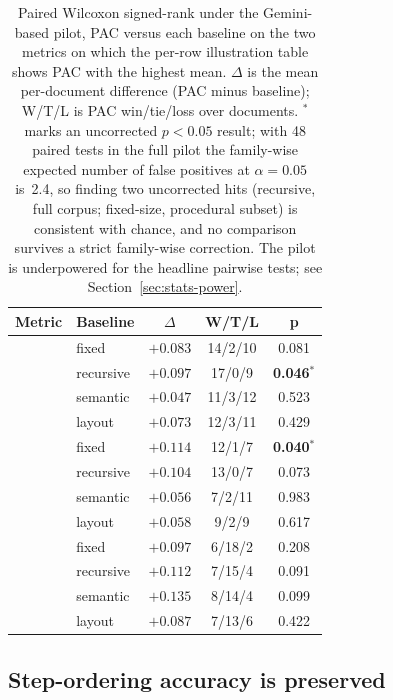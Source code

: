 \documentclass[make,article,submit,oneauthor,pdftex]{Definitions/mdpi}
\begin{document}
\begin{table}[ht]
\centering
\caption{Paired Wilcoxon signed-rank under the Gemini-based pilot,
PAC versus each baseline on the two metrics on which the per-row
illustration table shows PAC with the highest mean. $\Delta$ is the
mean per-document difference (PAC minus baseline); W/T/L is PAC
win/tie/loss over documents. $^{*}$ marks an uncorrected $p<0.05$
result; with 48 paired tests in the full pilot the family-wise
expected number of false positives at $\alpha=0.05$ is~2.4, so
finding two uncorrected hits (recursive, full corpus; fixed-size,
procedural subset) is consistent with chance, and no comparison
survives a strict family-wise correction. The pilot is underpowered
for the headline pairwise tests; see Section~\ref{sec:stats-power}.}
\label{tab:wilcoxon}
\begin{tabular}{llccc}
\toprule
Metric & Baseline & $\Delta$ & W/T/L & p \\
\midrule
{}
 & fixed     & $+0.083$ & 14/2/10 & 0.081 \\
 & recursive & $+0.097$ & 17/0/9  & \textbf{0.046}$^{*}$ \\
 & semantic  & $+0.047$ & 11/3/12 & 0.523 \\
 & layout    & $+0.073$ & 12/3/11 & 0.429 \\
\midrule
{}
 & fixed     & $+0.114$ & 12/1/7  & \textbf{0.040}$^{*}$ \\
 & recursive & $+0.104$ & 13/0/7  & 0.073 \\
 & semantic  & $+0.056$ &  7/2/11 & 0.983 \\
 & layout    & $+0.058$ &  9/2/9  & 0.617 \\
\midrule
{}
 & fixed     & $+0.097$ &  6/18/2 & 0.208 \\
 & recursive & $+0.112$ &  7/15/4 & 0.091 \\
 & semantic  & $+0.135$ &  8/14/4 & 0.099 \\
 & layout    & $+0.087$ &  7/13/6 & 0.422 \\
\bottomrule
\end{tabular}
\end{table}

\subsection{Step-ordering accuracy is preserved}
\end{document}
